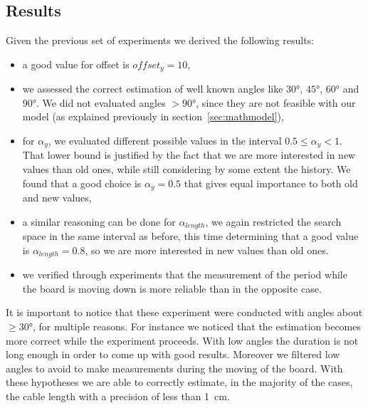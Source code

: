 \subsection{Results}
\label{sec:results}
Given the previous set of experiments we derived the following results:
\begin{itemize}
	\item a good value for offset is $offset_y = 10$,
	\item we assessed the correct estimation of well known angles like $30\si{\degree}$, $45\si{\degree}$, $60\si{\degree}$ and $90\si{\degree}$. We did not evaluated angles $> 90\si{\degree}$, since they are not feasible with our model (as explained previously in section~\ref{sec:mathmodel}),
	\item for $\alpha_y$, we evaluated different possible values in the interval $0.5 \leq \alpha_y < 1 $. That lower bound is justified by the fact that we are more interested in new values than old ones, while still considering by some extent the history. We found that a good choice is $\alpha_y = 0.5$ that gives equal importance to both old and new values,
	\item a similar reasoning can be done for $\alpha_{length}$, we again restricted the search space in the same interval as before, this time determining that a good value is $\alpha_{length} = 0.8$, so we are more interested in new values than old ones.
	\item we verified through experiments that the measurement of the period while the board is moving down is more reliable than in the opposite case.
\end{itemize}
It is important to notice that these experiment were conducted with angles about $\geq 30\si{\degree}$, for multiple reasons. For instance we noticed that the estimation becomes more correct while the experiment proceeds. With low angles the duration is not long enough in order to come up with good results. Moreover we filtered low angles to avoid to make measurements during the moving of the board.
With these hypotheses we are able to correctly estimate, in the majority of the cases, the cable length with a precision of less than \SI{1}{\cm}.

